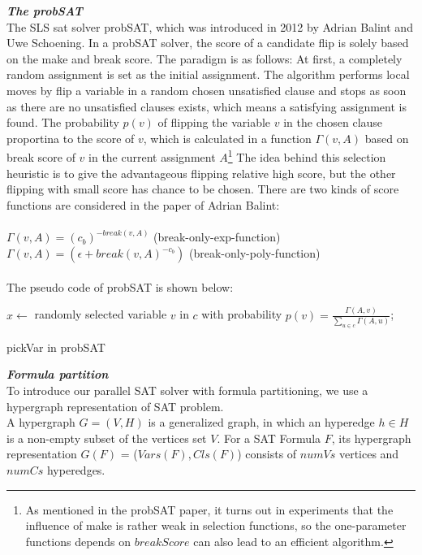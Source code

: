 \documentclass[12pt,a4paper,twoside]{scrartcl}
\numberwithin{equation}{section}
\begin{document}
\emph{\textbf{The probSAT}}\\
The SLS sat solver probSAT, which was introduced in 2012 by Adrian Balint and Uwe Schoening\cite{balint2016engineering}. In a probSAT solver, the score of a candidate flip is solely based on the make and break score. The paradigm is as follows: At first, a completely random assignment is set as the initial assignment. The algorithm performs local moves by flip a variable in a random chosen unsatisfied clause and stops as soon as there are no unsatisfied clauses exists, which means a satisfying assignment is found. The probability $p(v)$ of flipping the variable $v$ in the chosen clause proportina to the score of $v$, which is calculated in a function $\Gamma(v,A)$ based on break score of $v$ in the current assignment $A$\footnote{As mentioned in the probSAT paper, it turns out in experiments that the influence of make is rather weak in selection functions, so the one-parameter functions depends on $breakScore$ can also lead to an efficient algorithm.} The idea behind this selection heuristic is to give the advantageous flipping relative high score, but the other flipping with small score has chance to be chosen.  There are two kinds of score functions are considered in the paper of Adrian Balint: \\
\\
$\Gamma(v,A) = (c_b)^{-break(v,A)}$ (break-only-exp-function) \\
$\Gamma(v,A)=(\epsilon +break(v,A)^{-c_b})$  (break-only-poly-function)\\ 
\\
\clearpage
The pseudo code of probSAT is shown below:\\
\begin{algorithm}[H]
  $x \leftarrow$ randomly selected  variable $v$ in $c$ with probability $p(v) =\frac{\Gamma(A,v)}{\sum_{u \in c}\Gamma(A,u)}$; 
 \caption{pickVar in probSAT}
\end{algorithm} 
\emph{\textbf{Formula partition}}\\
To introduce our parallel SAT solver with formula partitioning, we use a  hypergraph representation of SAT problem. \\
A hypergraph $G = (V,H)$ is a generalized graph, in which an hyperedge $h \in H$ is a non-empty subset of the vertices set $V$. For a SAT Formula $F$, its hypergraph representation $G(F)$ = ($Vars(F),Cls(F)$) consists of $numVs$ vertices and $numCs$ hyperedges. 
\end{document}
